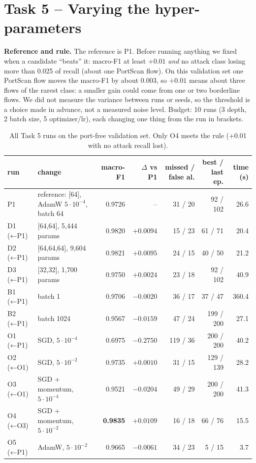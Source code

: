 \documentclass[9pt]{extarticle}
\newcommand{\run}[1]{\textsf{#1}}
\begin{document}
\section{Task 5 -- Varying the hyper-parameters}
\textbf{Reference and rule.} The reference is \run{P1}. Before running anything we fixed when a candidate ``beats'' it: macro-F1 at least $+0.01$ \emph{and} no attack class losing more than 0.025 of recall (about one PortScan flow). On this validation set one PortScan flow moves the macro-F1 by about 0.003, so $+0.01$ means about three flows of the rarest class: a smaller gain could come from one or two borderline flows. We did not measure the variance between runs or seeds, so the threshold is a choice made in advance, not a measured noise level. Budget: 10 runs (3 depth, 2 batch size, 5 optimizer/lr), each changing one thing from the run in brackets.

\begin{table}[h]
\centering\small
\begin{tabular}{llrrrrr}
\toprule
run & change & macro-F1 & $\Delta$ vs \run{P1} & missed / false al. & best / last ep. & time (s) \\
\midrule
\run{P1} & reference: [64], AdamW $5\cdot10^{-4}$, batch 64 & 0.9726 & -- & 31 / 20 & 92 / 102 & 26.6 \\
\run{D1 (←P1)} & [64,64], 5,444 params & 0.9820 & $+0.0094$ & 15 / 23 & 61 / 71 & 20.4 \\
\run{D2 (←P1)} & [64,64,64], 9,604 params & 0.9821 & $+0.0095$ & 24 / 15 & 40 / 50 & 21.2 \\
\run{D3 (←P1)} & [32,32], 1,700 params & 0.9750 & $+0.0024$ & 23 / 18 & 92 / 102 & 40.9 \\
\run{B1 (←P1)} & batch 1 & 0.9706 & $-0.0020$ & 36 / 17 & 37 / 47 & 360.4 \\
\run{B2 (←P1)} & batch 1024 & 0.9567 & $-0.0159$ & 47 / 24 & 199 / 200 & 27.1 \\
\run{O1 (←P1)} & SGD, $5\cdot10^{-4}$ & 0.6975 & $-0.2750$ & 119 / 36 & 200 / 200 & 40.2 \\
\run{O2 (←O1)} & SGD, $5\cdot10^{-2}$ & 0.9735 & $+0.0010$ & 31 / 15 & 129 / 139 & 28.2 \\
\run{O3 (←O1)} & SGD + momentum, $5\cdot10^{-4}$ & 0.9521 & $-0.0204$ & 49 / 29 & 200 / 200 & 41.3 \\
\run{O4 (←O3)} & SGD + momentum, $5\cdot10^{-2}$ & \textbf{0.9835} & $\mathbf{+0.0109}$ & 16 / 18 & 66 / 76 & 15.5 \\
\run{O5 (←P1)} & AdamW, $5\cdot10^{-2}$ & 0.9665 & $-0.0061$ & 34 / 23 & 5 / 15 & 3.7 \\
\bottomrule
\end{tabular}
\caption{All Task 5 runs on the port-free validation set. Only \run{O4} meets the rule (+0.01 with no attack recall lost).}
\label{tab:t5}
\end{table}
\end{document}
